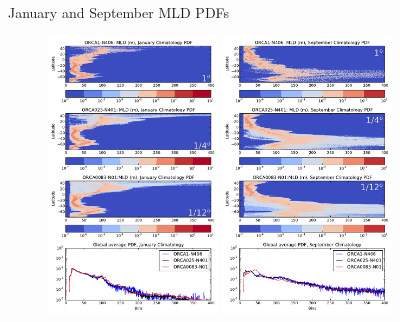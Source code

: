 \documentclass{beamer}
\begin{document}
\begin{frame}{January and September MLD PDFs}
\vspace{-0.5cm}
 \begin{figure}
  \center
	\includegraphics[width=0.4\textwidth]{PDF_MLD_JanCutP.png}
	\includegraphics[width=0.4\textwidth]{PDF_MLD_SeptCutP.png}
\end{figure}
\end{frame}
\end{document}
